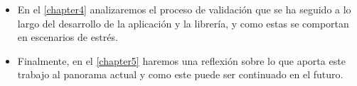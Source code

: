 \begin{itemize}
    \item En el \autoref{chapter4} analizaremos el proceso de validación que se ha seguido a lo largo del desarrollo de la aplicación y la librería, y como estas se comportan en escenarios de estrés.
    
    \item Finalmente, en el \autoref{chapter5} haremos una reflexión sobre lo que aporta este trabajo al panorama actual y como este puede ser continuado en el futuro.
\end{itemize}

\endinput
